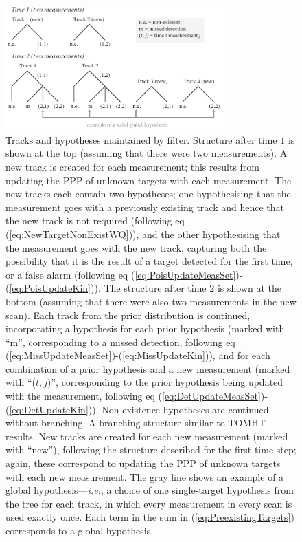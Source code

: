 \documentclass[journal,twoside]{IEEEtran}
\theoremstyle{plain}
\begin{document}
\begin{figure}[tb]
\centering
\includegraphics[width=3.3in]{figure1.pdf} %
\caption{Tracks and hypotheses maintained by filter. Structure after time $1$ is shown at the top (assuming that there were two measurements). A new track is created for each measurement; this results from updating the PPP of unknown targets with each measurement. The new tracks each contain two hypotheses; one hypothesising that the measurement goes with a previously existing track and hence that the new track is not required (following eq (\ref{eq:NewTargetNonExistWQ})), and the other hypothesising that the measurement goes with the new track, capturing both the possibility that it is the result of a target detected for the first time, or a false alarm (following eq (\ref{eq:PoisUpdateMeasSet})-(\ref{eq:PoisUpdateKin})). The structure after time $2$ is shown at the bottom (assuming that there were also two measurements in the new scan). Each track from the prior distribution is continued, incorporating a hypothesis for each prior hypothesis (marked with ``m'', corresponding to a missed detection, following eq (\ref{eq:MissUpdateMeasSet})-(\ref{eq:MissUpdateKin})), and for each combination of a prior hypothesis and a new measurement (marked with ``($t,j)$'', corresponding to the prior hypothesis being updated with the measurement, following eq (\ref{eq:DetUpdateMeasSet})-(\ref{eq:DetUpdateKin})). Non-existence hypotheses are continued without branching. A branching structure similar to TOMHT results. New tracks are created for each new measurement (marked with ``new''), following the structure described for the first time step; again, these correspond to updating the PPP of unknown targets with each new measurement. The gray line shows an example of a global hypothesis---\textit{i.e.}\xspace, a choice of one single-target hypothesis from the tree for each track, in which every measurement in every scan is used exactly once. Each term in the sum in (\ref{eq:PreexistingTargets}) corresponds to a global hypothesis.
}\label{fig:MBMStructure} \vspace*{-9pt}
\end{figure}
\end{document}
